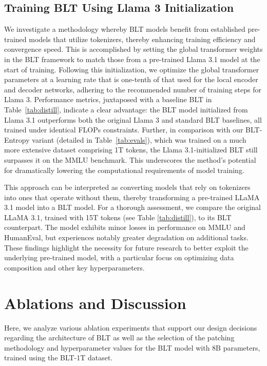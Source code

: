 \subsection{Training {\textsc BLT} Using Llama 3 Initialization}
\label{sec:distillation}
We investigate a methodology whereby {\textsc BLT} models benefit from established pre-trained models that utilize tokenizers, thereby enhancing training efficiency and convergence speed. This is accomplished by setting the global transformer weights in the {\textsc BLT} framework to match those from a pre-trained Llama 3.1 model at the start of training. Following this initialization, we optimize the global transformer parameters at a learning rate that is one-tenth of that used for the local encoder and decoder networks, adhering to the recommended number of training steps for Llama 3. Performance metrics, juxtaposed with a baseline {\textsc BLT} in Table~\ref{tab:distill}, indicate a clear advantage: the {\textsc BLT} model initialized from Llama 3.1 outperforms both the original Llama 3 and standard {\textsc BLT} baselines, all trained under identical FLOPs constraints. Further, in comparison with our {\textsc BLT}-Entropy variant (detailed in Table~\ref{tab:evals}), which was trained on a much more extensive dataset comprising 1T tokens, the Llama 3.1-initialized {\textsc BLT} still surpasses it on the MMLU benchmark. This underscores the method's potential for dramatically lowering the computational requirements of model training.

This approach can be interpreted as converting models that rely on tokenizers into ones that operate without them, thereby transforming a pre-trained LLaMA 3.1 model into a {\textsc BLT} model. For a thorough assessment, we compare the original LLaMA 3.1, trained with 15T tokens (see Table \ref{tab:distill}), to its {\textsc BLT} counterpart. The model exhibits minor losses in performance on MMLU and HumanEval, but experiences notably greater degradation on additional tasks. These findings highlight the necessity for future research to better exploit the underlying pre-trained model, with a particular focus on optimizing data composition and other key hyperparameters.

\section{Ablations and Discussion}
\label{section:ablations}
Here, we analyze various ablation experiments that support our design decisions regarding the architecture of {\textsc BLT} as well as the selection of the patching methodology and hyperparameter values for the {\textsc BLT} model with 8B parameters, trained using the {\textsc BLT}-1T dataset.


